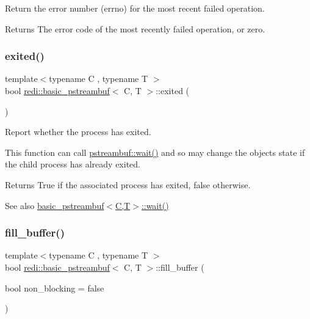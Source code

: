 Return the error number (errno) for the most recent failed operation. 

\begin{DoxyReturn}{Returns}
The error code of the most recently failed operation, or zero. 
\end{DoxyReturn}
\mbox{\label{classredi_1_1basic__pstreambuf_a9ed1ec24bfa867c99b6bf8a35a94d063}} 
\subsubsection{\texorpdfstring{exited()}{exited()}}
{\footnotesize\ttfamily template$<$typename C , typename T $>$ \\
bool \mbox{\hyperlink{classredi_1_1basic__pstreambuf}{redi\+::basic\+\_\+pstreambuf}}$<$ C, T $>$\+::exited (\begin{DoxyParamCaption}{ }\end{DoxyParamCaption})\hspace{0.3cm}{\ttfamily [inline]}}



Report whether the process has exited. 

This function can call \mbox{\hyperlink{classredi_1_1basic__pstreambuf_afa976526cfb7ea56e29afbee8ead68e1}{pstreambuf\+::wait()}} and so may change the object\textquotesingle{}s state if the child process has already exited.

\begin{DoxyReturn}{Returns}
True if the associated process has exited, false otherwise. 
\end{DoxyReturn}
\begin{DoxySeeAlso}{See also}
\mbox{\hyperlink{classredi_1_1basic__pstreambuf_afa976526cfb7ea56e29afbee8ead68e1}{basic\+\_\+pstreambuf$<$\+C,\+T$>$\+::wait()}} 
\end{DoxySeeAlso}
\mbox{\label{classredi_1_1basic__pstreambuf_ac84fcdc04e6d81fc1118b21c4ba6e5b2}} 
\subsubsection{\texorpdfstring{fill\+\_\+buffer()}{fill\_buffer()}}
{\footnotesize\ttfamily template$<$typename C , typename T $>$ \\
bool \mbox{\hyperlink{classredi_1_1basic__pstreambuf}{redi\+::basic\+\_\+pstreambuf}}$<$ C, T $>$\+::fill\+\_\+buffer (\begin{DoxyParamCaption}\item[{bool}]{non\+\_\+blocking = {\ttfamily false} }\end{DoxyParamCaption})\hspace{0.3cm}{\ttfamily [protected]}}

